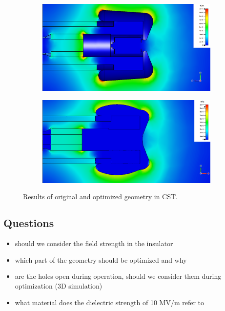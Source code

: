\begin{center}
\begin{figure}[H]
   \begin{subfigure}{0.45\textwidth}
      \includegraphics[width=\textwidth]{figures/200kV/cst/efield_orig}
   \end{subfigure}
   \begin{subfigure}{0.45\textwidth}
      \includegraphics[width=\textwidth]{figures/200kV/cst/efield_insulator_new}
   \end{subfigure}
   \caption{Results of original and optimized geometry in CST.}
\end{figure}
\end{center}

\subsection{Questions}
\begin{itemize}
   \item should we consider the field strength in the insulator
   \item which part of the geometry should be optimized and why
   \item are the holes open during operation, should we consider them during optimization (3D simulation)
   \item what material does the dielectric strength of 10 MV/m refer to
\end{itemize}

